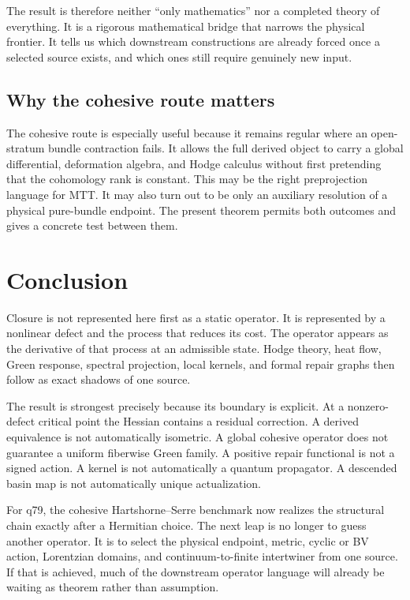 \documentclass[11pt,a4paper]{article}
\begin{document}
The result is therefore neither ``only mathematics'' nor a completed theory
of everything.  It is a rigorous mathematical bridge that narrows the
physical frontier.  It tells us which downstream constructions are already
forced once a selected source exists, and which ones still require genuinely
new input.

\subsection{Why the cohesive route matters}

The cohesive route is especially useful because it remains regular where an
open-stratum bundle contraction fails.  It allows the full derived object to
carry a global differential, deformation algebra, and Hodge calculus without
first pretending that the cohomology rank is constant.  This may be the right
preprojection language for MTT.  It may also turn out to be only an auxiliary
resolution of a physical pure-bundle endpoint.  The present theorem permits
both outcomes and gives a concrete test between them.

\section{Conclusion}

Closure is not represented here first as a static operator.  It is
represented by a nonlinear defect and the process that reduces its cost.
The operator appears as the derivative of that process at an admissible
state.  Hodge theory, heat flow, Green response, spectral projection, local
kernels, and formal repair graphs then follow as exact shadows of one source.

The result is strongest precisely because its boundary is explicit.  At a
nonzero-defect critical point the Hessian contains a residual correction.  A
derived equivalence is not automatically isometric.  A global cohesive
operator does not guarantee a uniform fiberwise Green family.  A positive
repair functional is not a signed action.  A kernel is not automatically a
quantum propagator.  A descended basin map is not automatically unique
actualization.

For q79, the cohesive Hartshorne--Serre benchmark now realizes the structural
chain exactly after a Hermitian choice.  The next leap is no longer to guess
another operator.  It is to select the physical endpoint, metric, cyclic or
BV action, Lorentzian domains, and continuum-to-finite intertwiner from one
source.  If that is achieved, much of the downstream operator language will
already be waiting as theorem rather than assumption.
\end{document}
